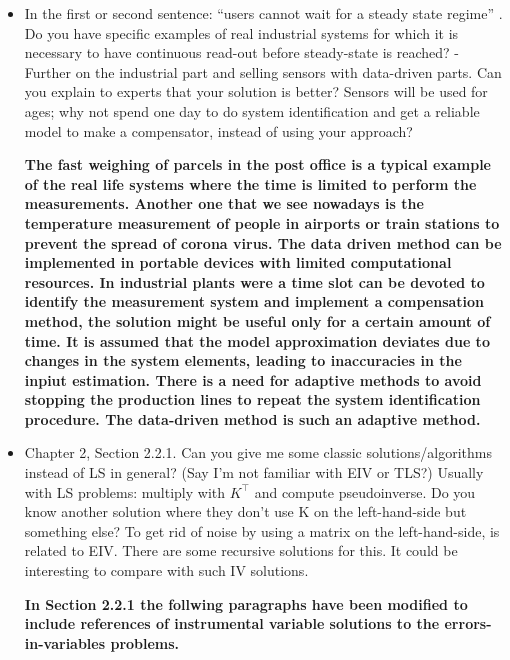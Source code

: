 \documentclass[11pt]{article}
\begin{document}
\begin{itemize}
	\item In the first or second sentence: “users cannot wait for a steady state regime” . Do you have specific examples of real industrial systems for which it is necessary to have continuous read-out before steady-state is reached? - Further on the industrial part and selling sensors with data-driven parts. Can you explain to experts that your solution is better? Sensors will be used for ages; why not spend one day to do system identification and get a reliable model to make a compensator, instead of using your approach?
	
	{\bfseries The fast weighing of parcels in the post office is a typical example of the real life systems where the time is limited to perform the measurements. Another one that we see nowadays is the temperature measurement of people in airports or train stations to prevent the spread of corona virus. The data driven method can be implemented in portable devices with limited computational resources. In industrial plants were a time slot can be devoted to identify the measurement system and implement a compensation method, the solution might be useful only for a certain amount of time. It is assumed that the model approximation deviates due to changes in the system elements, leading to inaccuracies in the inpiut estimation. There is a need for adaptive methods to avoid stopping the production lines to repeat the system identification procedure. The data-driven method is such an adaptive method. }
	
	\item  Chapter 2, Section 2.2.1. Can you give me some classic solutions/algorithms instead of LS in general? (Say I'm not familiar with EIV or TLS?) Usually with LS problems: multiply with $K^\top$ and compute pseudoinverse. Do you know another solution where they don't use K on the left-hand-side but something else? To get rid of noise by using a matrix on the left-hand-side, is related to EIV. There are some recursive solutions for this. It could be interesting to compare with such IV solutions.
	
	{\bfseries In Section 2.2.1 the follwing paragraphs have been modified to include references of instrumental variable solutions to the errors-in-variables problems.}
	

\end{itemize}
\end{document}
